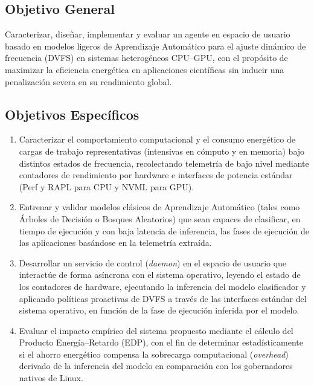 \documentclass[12pt,oneside,spanish]{book}
\begin{document}
\subsection*{Objetivo General}

Caracterizar, diseñar, implementar y evaluar un agente en espacio de usuario basado en modelos ligeros de Aprendizaje Automático para el ajuste dinámico de frecuencia (DVFS) en sistemas heterogéneos CPU--GPU, con el propósito de maximizar la eficiencia energética en aplicaciones científicas sin inducir una penalización severa en su rendimiento global.

\subsection*{Objetivos Específicos}

\begin{enumerate}

    \item Caracterizar el comportamiento computacional y el consumo energético de cargas de trabajo representativas (intensivas en cómputo y en memoria) bajo distintos estados de frecuencia, recolectando telemetría de bajo nivel mediante contadores de rendimiento por hardware e interfaces de potencia estándar (Perf y RAPL para CPU y NVML para GPU).

    \item Entrenar y validar modelos clásicos de Aprendizaje Automático (tales como Árboles de Decisión o Bosques Aleatorios) que sean capaces de clasificar, en tiempo de ejecución y con baja latencia de inferencia, las fases de ejecución de las aplicaciones basándose en la telemetría extraída.

    \item Desarrollar un servicio de control (\textit{daemon}) en el espacio de usuario que interactúe de forma asíncrona con el sistema operativo, leyendo el estado de los contadores de hardware, ejecutando la inferencia del modelo clasificador y aplicando políticas proactivas de DVFS a través de las interfaces estándar del sistema operativo, en función de la fase de ejecución inferida por el modelo.

    \item Evaluar el impacto empírico del sistema propuesto mediante el cálculo del Producto Energía--Retardo (EDP), con el fin de determinar estadísticamente si el ahorro energético compensa la sobrecarga computacional (\textit{overhead}) derivado de la inferencia del modelo en comparación con los gobernadores nativos de Linux.

\end{enumerate}
\end{document}
